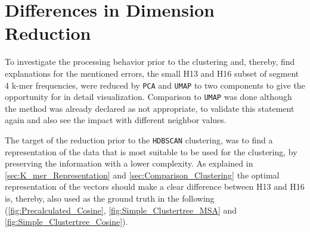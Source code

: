 \section{Differences in Dimension Reduction} \label{sec:Dimension_Reduction}

To investigate the processing behavior prior to the clustering and, thereby, find explanations for the mentioned errors, the small H13 and H16 subset of segment 4 k-mer frequencies, were reduced by \texttt{PCA} and \texttt{UMAP} to two components to give the opportunity for in detail visualization. Comparison to \texttt{UMAP} was done although the method was already declared as not appropriate, to validate this statement again and also see the impact with different neighbor values. 

The target of the reduction prior to the \texttt{HDBSCAN} clustering, was to find a representation of the data that is most suitable to be used for the clustering, by preserving the information with a lower complexity. As explained in \autoref{sec:K_mer_Representation} and \autoref{sec:Comparison_Clustering} the optimal representation of the vectors should make a clear difference between H13 and H16 is, thereby, also used as the ground truth in the following (\autoref{fig:Precalculated_Cosine}, \autoref{fig:Simple_Clustertree_MSA} and \autoref{fig:Simple_Clustertree_Cosine}).

